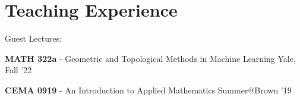 \documentclass[margin,line]{res}
\newenvironment{list1}{
  \begin{list}{\ding{113}}{
      \setlength{\itemsep}{0in}
      \setlength{\parsep}{0in} \setlength{\parskip}{0in}
      \setlength{\topsep}{0in} \setlength{\partopsep}{0in}
      \setlength{\leftmargin}{0.17in}}}{\end{list}}
\begin{document}
\begin{resume}
{\begin{itemize}

\end{itemize}
}


\section{\sc Teaching Experience}

Guest Lectures:
\vspace*{.2cm}

\begin{list1}
\setlength\itemsep{0.25em}
\item[] {\bf MATH 322a} - Geometric and Topological Methods in Machine Learning \hfill Yale, Fall '22
\item[] {\bf CEMA 0919} - An Introduction to Applied Mathematics \hfill Summer@Brown '19
\end{list1} 


\end{resume}
\end{document}
